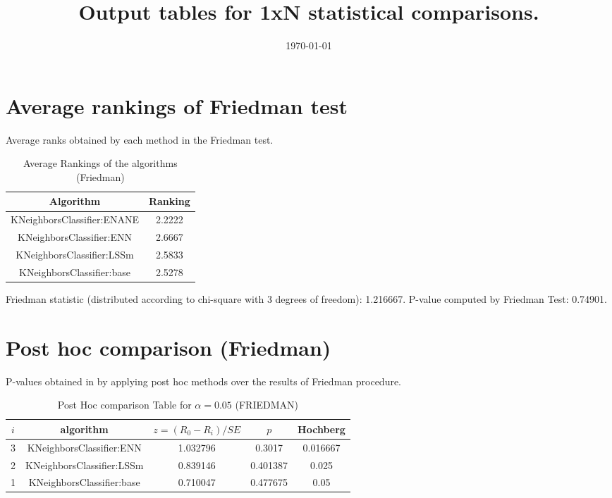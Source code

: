 \documentclass[a4paper,10pt]{article}
\title{Output tables for 1xN statistical comparisons.}
\author{}
\date{\today}
\begin{document}
\begin{landscape}
\pagestyle{empty}
\maketitle
\thispagestyle{empty}

\section{Average rankings of Friedman test}


Average ranks obtained by each method in the Friedman test.

\begin{table}[!htp]
\centering
\begin{tabular}{|c|c|}\hline
Algorithm&Ranking\\\hline
KNeighborsClassifier:ENANE&2.2222\\KNeighborsClassifier:ENN&2.6667\\KNeighborsClassifier:LSSm&2.5833\\KNeighborsClassifier:base&2.5278\\\hline\end{tabular}
\caption{Average Rankings of the algorithms (Friedman)}
\end{table}

Friedman statistic (distributed according to chi-square with 3 degrees of freedom): 1.216667. \newline P-value computed by Friedman Test: 0.74901.\newline


\newpage

\section{Post hoc comparison (Friedman)}


P-values obtained in by applying post hoc methods over the results of Friedman procedure.

\begin{table}[!htp]
\centering\footnotesize
\begin{tabular}{ccccc}
$i$&algorithm&$z=(R_0 - R_i)/SE$&$p$&Hochberg \\
\hline3&KNeighborsClassifier:ENN&1.032796&0.3017&0.016667\\2&KNeighborsClassifier:LSSm&0.839146&0.401387&0.025\\1&KNeighborsClassifier:base&0.710047&0.477675&0.05\\\hline
\end{tabular}
\caption{Post Hoc comparison Table for $\alpha=0.05$ (FRIEDMAN)}
\end{table}
\newpage


\end{landscape}
\end{document}
